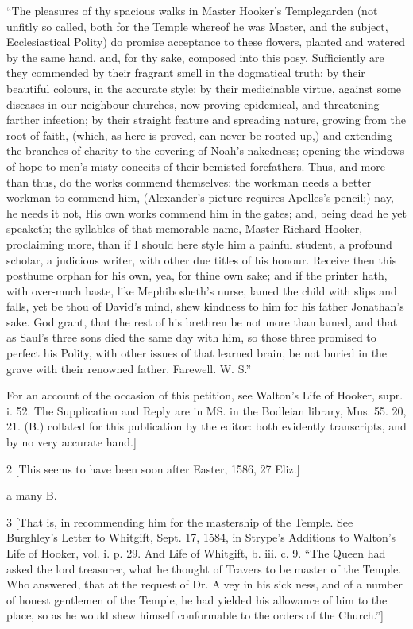 “The pleasures of thy spacious walks in Master Hooker’s Templegarden (not unfitly so called, both for the Temple whereof he was Master, and the subject, Ecclesiastical Polity) do promise acceptance to these flowers, planted and watered by the same hand, and, for thy sake, composed into this posy. Sufficiently are they commended by their fragrant smell in the dogmatical truth; by their beautiful colours, in the accurate style; by their medicinable virtue, against some diseases in our neighbour churches, now proving epidemical, and threatening farther infection; by their straight feature and spreading nature, growing from the root of faith, (which, as here is proved, can never be rooted up,) and extending the branches of charity to the covering of Noah’s nakedness; opening the windows of hope to men’s misty conceits of their bemisted forefathers. Thus, and more than thus, do the works commend themselves: the workman needs a better workman to commend him, (Alexander’s picture requires Apelles’s pencil;) nay, he needs it not, His own works commend him in the gates; and, being dead he yet speaketh; the syllables of that memorable name, Master Richard Hooker, proclaiming more, than if I should here style him a painful student, a profound scholar, a judicious writer, with other due titles of his honour. Receive then this posthume orphan for his own, yea, for thine own sake; and if the printer hath, with over-much haste, like Mephibosheth’s nurse, lamed the child with slips and falls, yet be thou of David’s mind, shew kindness to him for his father Jonathan’s sake. God grant, that the rest of his brethren be not more than lamed, and that as Saul’s three sons died the same day with him, so those three promised to perfect his Polity, with other issues of that learned brain, be not buried in the grave with their renowned father. Farewell. W. S.”

For an account of the occasion of this petition, see Walton’s Life of Hooker, supr. i. 52. The Supplication and Reply are in MS. in the Bodleian library, Mus. 55. 20, 21. (B.) collated for this publication by the editor: both evidently transcripts, and by no very accurate hand.]

2
[This seems to have been soon after Easter, 1586, 27 Eliz.]

a
many B.

3
[That is, in recommending him for the mastership of the Temple. See Burghley’s Letter to Whitgift, Sept. 17, 1584, in Strype’s Additions to Walton’s Life of Hooker, vol. i. p. 29. And Life of Whitgift, b. iii. c. 9. “The Queen had asked the lord treasurer, what he thought of Travers to be master of the Temple. Who answered, that at the request of Dr. Alvey in his sick ness, and of a number of honest gentlemen of the Temple, he had yielded his allowance of him to the place, so as he would shew himself conformable to the orders of the Church.”]

